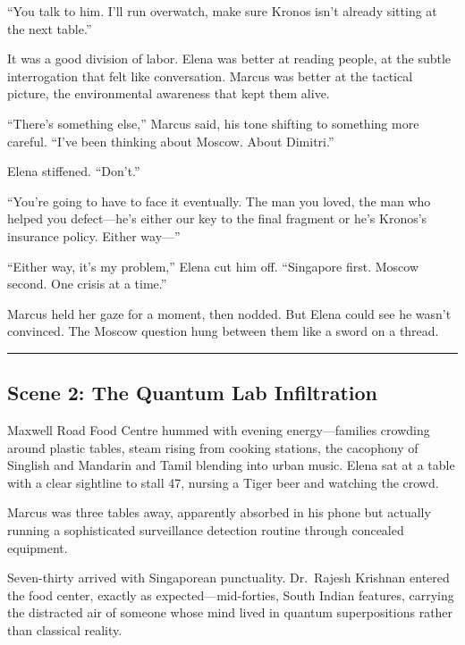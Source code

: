 ``You talk to him. I'll run overwatch, make sure Kronos isn't already sitting at the next table.''

It was a good division of labor. Elena was better at reading people, at the subtle interrogation that felt like conversation. Marcus was better at the tactical picture, the environmental awareness that kept them alive.

``There's something else,'' Marcus said, his tone shifting to something more careful. ``I've been thinking about Moscow. About Dimitri.''

Elena stiffened. ``Don't.''

``You're going to have to face it eventually. The man you loved, the man who helped you defect---he's either our key to the final fragment or he's Kronos's insurance policy. Either way---''

``Either way, it's my problem,'' Elena cut him off. ``Singapore first. Moscow second. One crisis at a time.''

Marcus held her gaze for a moment, then nodded. But Elena could see he wasn't convinced. The Moscow question hung between them like a sword on a thread.

\begin{center}\rule{0.5\linewidth}{0.5pt}\end{center}

\hypertarget{scene-2-the-quantum-lab-infiltration}{%
\subsection{Scene 2: The Quantum Lab Infiltration}\label{scene-2-the-quantum-lab-infiltration}}

Maxwell Road Food Centre hummed with evening energy---families crowding around plastic tables, steam rising from cooking stations, the cacophony of Singlish and Mandarin and Tamil blending into urban music. Elena sat at a table with a clear sightline to stall 47, nursing a Tiger beer and watching the crowd.

Marcus was three tables away, apparently absorbed in his phone but actually running a sophisticated surveillance detection routine through concealed equipment.

Seven-thirty arrived with Singaporean punctuality. Dr.~Rajesh Krishnan entered the food center, exactly as expected---mid-forties, South Indian features, carrying the distracted air of someone whose mind lived in quantum superpositions rather than classical reality.

